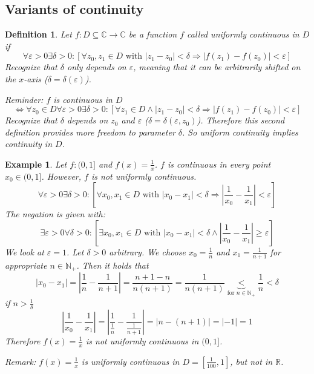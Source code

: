 \documentclass[a4paper,landscape,twocolumn]{article}
\newtheorem{defi}{Definition}
\newtheorem{ex}{Example}
\newcommand\abs[1]{\left|#1\right|}
\begin{document}
\subsection{Variants of continuity}
%
\begin{defi}
  Let $f: D \subseteq \mathbb C \rightarrow \mathbb C$ be a function $f$
  called uniformly continuous in $D$ if
  \[
    \forall \varepsilon > 0 \exists \delta > 0:
    \left[
      \forall z_0, z_1 \in D \text{ with } \abs{z_1 - z_0} < \delta
      \Rightarrow \abs{f(z_1) - f(z_0)} < \varepsilon
    \right]
  \]
  Recognize that $\delta$ only depends on $\varepsilon$,
  meaning that it can be arbitrarily shifted on the $x$-axis ($\delta = \delta(\varepsilon)$).

  Reminder: $f$ is continuous in $D$
  \[
    \Leftrightarrow \forall z_0 \in D \forall \varepsilon > 0 \exists \delta > 0:
    \left[
      \forall z_1 \in D \land \abs{z_1 - z_0} < \delta
      \Rightarrow \abs{f(z_1) - f(z_0)} < \varepsilon
    \right]
  \]
  Recognize that $\delta$ depends on $z_0$ and $\varepsilon$
  ($\delta = \delta(\varepsilon, z_0)$).
  Therefore this second definition provides more freedom to parameter $\delta$.
  So uniform continuity implies continuity in $D$.
\end{defi}
%
\begin{ex}
  Let $f: (0, 1]$ and $f(x) = \frac1x$.
  $f$ is continuous in every point $x_0 \in (0, 1]$.
  However, $f$ is not uniformly continuous.
  \[
    \forall \varepsilon > 0 \exists \delta > 0:
    \left[
      \forall x_0, x_1 \in D \text{ with } \abs{x_0 - x_1} < \delta
      \Rightarrow \abs{\frac1{x_0} - \frac1{x_1}} < \varepsilon
    \right]
  \]
  The negation is given with:
  \[
    \exists \varepsilon > 0 \forall \delta > 0:
    \left[
      \exists x_0, x_1 \in D \text{ with }
      \abs{x_0 - x_1} < \delta \land \abs{\frac1{x_0} - \frac1{x_1}} \geq \varepsilon
    \right]
  \]
  We look at $\varepsilon = 1$.
  Let $\delta > 0$ arbitrary. We choose $x_0 = \frac1n$ and $x_1 = \frac1{n+1}$
  for appropriate $n \in \mathbb N_+$. Then it holds that
  \[
    \abs{x_0 - x_1} = \abs{\frac1n - \frac1{n+1}} =
    \frac{n + 1 - n}{n (n + 1)} = \frac1{n (n + 1)}
    \underbrace{<}_{\text{for } n \in \mathbb N_+}
    \frac1n
    <
    \delta
  \]
  if $n > \frac1\delta$
  \[
    \abs{\frac1{x_0} - \frac1{x_1}}
    = \abs{\frac1{\frac1n} - \frac1{\frac1{n+1}}}
    = \abs{n - (n + 1)}
    = \abs{-1}
    = 1
  \]
  Therefore $f(x) = \frac1x$ is not uniformly continuous in $(0, 1]$.

  Remark: $f(x) = \frac1x$ is uniformly continuous in $D = [\frac1{100}, 1]$,
  but not in $\mathbb R$.
\end{ex}
\end{document}
